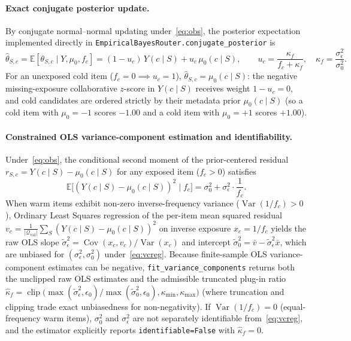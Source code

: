 \paragraph{Exact conjugate posterior update.}
By conjugate normal--normal updating under~\eqref{eq:obs}, the posterior expectation implemented directly in
\texttt{EmpiricalBayesRouter.conjugate\_posterior} is
\begin{equation}
  \hat{\theta}_{S,c}
  = \mathbb{E}[\theta_{S,c}\mid Y,\mu_0,f_c]
  = (1 - u_c)\,Y(c\mid S) + u_c\,\mu_0(c\mid S),
  \qquad u_c = \frac{\kappa_f}{f_c + \kappa_f},\quad \kappa_f = \frac{\sigma_\epsilon^2}{\sigma_0^2}.
  \label{eq:posterior}
\end{equation}
For an unexposed cold item ($f_c = 0 \implies u_c = 1$), $\hat{\theta}_{S,c} = \mu_0(c\mid S)$: the negative
missing-exposure collaborative $z$-score in $Y(c\mid S)$ receives weight $1 - u_c = 0$, and cold candidates are
ordered strictly by their metadata prior $\mu_0(c\mid S)$ (so a cold item with $\mu_0 = -1$ scores $-1.00$ and a
cold item with $\mu_0 = +1$ scores $+1.00$).

\paragraph{Constrained OLS variance-component estimation and identifiability.}
Under~\eqref{eq:obs}, the conditional second moment of the prior-centered residual $r_{S,c} = Y(c\mid S) -
\mu_0(c\mid S)$ for any exposed item ($f_c > 0$) satisfies
\begin{equation}
  \mathbb{E}\!\big[(Y(c\mid S) - \mu_0(c\mid S))^2 \;\big|\; f_c\big]
  = \sigma_0^2 + \sigma_\epsilon^2 \cdot \frac{1}{f_c}.
  \label{eq:vcreg}
\end{equation}
When warm items exhibit non-zero inverse-frequency variance ($\operatorname{Var}(1/f_c) > 0$), Ordinary Least
Squares regression of the per-item mean squared residual $v_c = \frac{1}{|\mathcal{Q}_{\text{val}}|}\sum_{S}
(Y(c\mid S) - \mu_0(c\mid S))^2$ on inverse exposure $x_c = 1/f_c$ yields the raw OLS slope
$\tilde{\sigma}_\epsilon^2 = \operatorname{Cov}(x_c,v_c)/\operatorname{Var}(x_c)$ and intercept
$\tilde{\sigma}_0^2 = \bar{v} - \tilde{\sigma}_\epsilon^2\bar{x}$, which are unbiased for $(\sigma_\epsilon^2,
\sigma_0^2)$ under~\eqref{eq:vcreg}. Because finite-sample OLS variance-component estimates can be negative,
\texttt{fit\_variance\_components} returns both the unclipped raw OLS estimates and the admissible truncated
plug-in ratio $\hat{\kappa}_f = \operatorname{clip}\big(\max(\tilde{\sigma}_\epsilon^2,\epsilon_0) /
\max(\tilde{\sigma}_0^2,\epsilon_0), \kappa_{\min}, \kappa_{\max}\big)$ (where truncation and clipping trade
exact unbiasedness for non-negativity). If $\operatorname{Var}(1/f_c) = 0$ (equal-frequency warm items),
$\sigma_0^2$ and $\sigma_\epsilon^2$ are not separately identifiable from~\eqref{eq:vcreg}, and the estimator
explicitly reports \texttt{identifiable=False} with $\hat{\kappa}_f = 0$.

